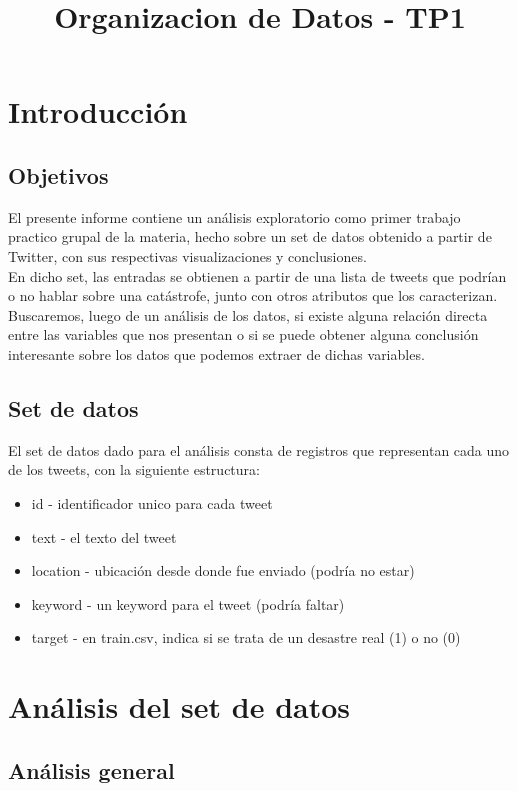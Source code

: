 \documentclass[12pt,a4paper,draft]{article}
\title{Organizacion de Datos - TP1}
\begin{document}
\maketitle
\newpage
\tableofcontents

\newpage
\section{Introducción}

\subsection{Objetivos}
El presente informe contiene un análisis exploratorio como primer trabajo practico grupal de la materia, hecho sobre un set de datos obtenido a partir de Twitter, con sus respectivas visualizaciones y conclusiones. \\[0.25cm]

En dicho set, las entradas se obtienen a partir de una lista de tweets que podrían o no hablar sobre una catástrofe, junto con otros atributos que los caracterizan. Buscaremos, luego de un análisis de los datos, si existe alguna relación directa entre las variables que nos presentan o si se puede obtener alguna conclusión interesante sobre los datos que podemos extraer de dichas variables.

\subsection{Set de datos}
El set de datos dado para el análisis consta de registros que representan cada uno de los tweets, con la siguiente estructura:
\begin{itemize}
\item id - identificador unico para cada  tweet
\item text - el texto del tweet
\item location - ubicación desde donde fue enviado (podría no estar)
\item keyword - un keyword para el tweet  (podría faltar)
\item target - en train.csv, indica si se trata de un desastre real  (1) o no (0)
\end{itemize}


\newpage
\section{Análisis del set de datos}

\subsection{Análisis general}
\end{document}
